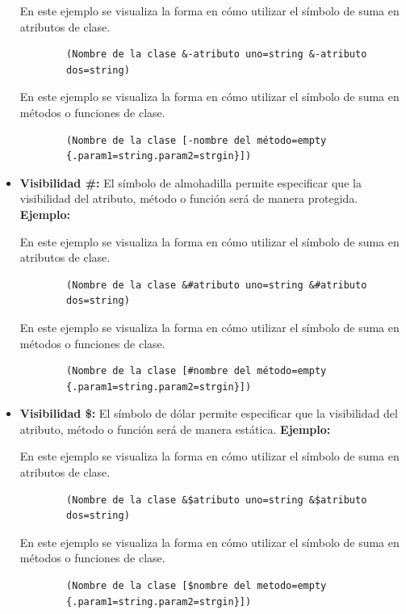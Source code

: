 \begin{itemize}
	En este ejemplo se visualiza la forma en cómo utilizar el símbolo de suma en atributos de clase.
	
	\begin{verbatim}
		(Nombre de la clase &-atributo uno=string &-atributo 
		dos=string)
	\end{verbatim}
	
	En este ejemplo se visualiza la forma en cómo utilizar el símbolo de suma en métodos o funciones de clase.
	
	\begin{verbatim}
		(Nombre de la clase [-nombre del método=empty
		{.param1=string.param2=strgin}])
	\end{verbatim}
	
	\item \textbf{Visibilidad \#: } El símbolo de almohadilla permite especificar que la visibilidad del atributo, método o función será de manera protegida. \textbf{Ejemplo:}
	
	En este ejemplo se visualiza la forma en cómo utilizar el símbolo de suma en atributos de clase.
	
	\begin{verbatim}
		(Nombre de la clase &#atributo uno=string &#atributo 
		dos=string)
	\end{verbatim}
	
	En este ejemplo se visualiza la forma en cómo utilizar el símbolo de suma en métodos o funciones de clase.
	
	\begin{verbatim}
		(Nombre de la clase [#nombre del método=empty
		{.param1=string.param2=strgin}])
	\end{verbatim}
	
	\item \textbf{Visibilidad \$: } El símbolo de dólar permite especificar que la visibilidad del atributo, método o función será de manera estática. \textbf{Ejemplo:}
	
	En este ejemplo se visualiza la forma en cómo utilizar el símbolo de suma en atributos de clase.
	
	\begin{verbatim}
		(Nombre de la clase &$atributo uno=string &$atributo 
		dos=string)
	\end{verbatim}
	
	En este ejemplo se visualiza la forma en cómo utilizar el símbolo de suma en métodos o funciones de clase.
	
	\begin{verbatim}
		(Nombre de la clase [$nombre del metodo=empty
		{.param1=string.param2=strgin}])
	\end{verbatim}
	

\end{itemize}
